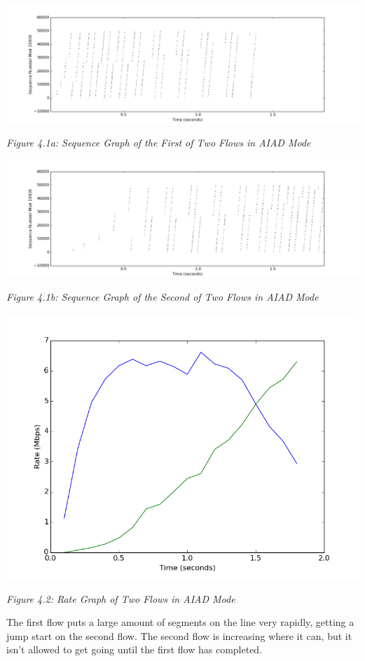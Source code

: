 \documentclass[11pt]{article}
\begin{document}
\includegraphics[width=17cm]{outputs/AIAD/AIAD_sequence1000.png}

\centerline{\emph{Figure 4.1a: Sequence Graph of the First of Two Flows in AIAD Mode}}

\includegraphics[width=17cm]{outputs/AIAD/AIAD_sequence2000.png}

\centerline{\emph{Figure 4.1b: Sequence Graph of the Second of Two Flows in AIAD Mode}}


\includegraphics[width=17cm]{outputs/AIAD/AIAD_rate.png}

\centerline{\emph{Figure 4.2: Rate Graph of Two Flows in AIAD Mode}}

The first flow puts a large amount of segments on the line very rapidly, getting a jump start on the second flow. The second flow is increasing where it can, but it isn't allowed to get going until the first flow has completed. 
\end{document}
